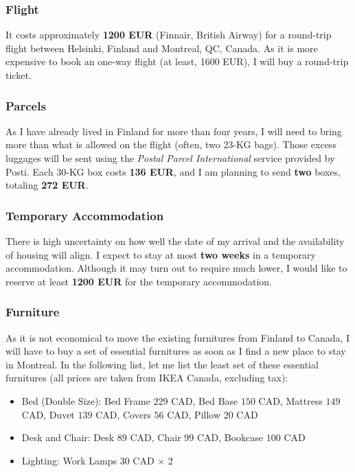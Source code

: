 \documentclass[11pt, oneside]{essay}
\begin{document}
\subsubsection{Flight}

It costs approximately \textbf{1200 EUR} (Finnair, British
Airway) for a round-trip flight between Helsinki, Finland
and Montreal, QC, Canada. As it is more expensive to book an
one-way flight (at least, 1600 EUR), I will buy a round-trip
ticket. 

\subsubsection{Parcels}

As I have already lived in Finland for more than four years,
I will need to bring more than what is allowed on the flight
(often, two 23-KG bags). Those excess luggages will be sent
using the \textit{Postal Parcel International} service
provided by Posti. Each 30-KG box costs \textbf{136 EUR},
and I am planning to send \textbf{two} boxes, totaling
\textbf{272 EUR}.

\subsubsection{Temporary Accommodation}

There is high uncertainty on how well the date of my arrival and
the availability of housing will align. I expect to stay at most
\textbf{two weeks} in a temporary accommodation. Although it may
turn out to require much lower, I would like to reserve at least
\textbf{1200 EUR} for the temporary accommodation.

\subsubsection{Furniture}

As it is not economical to move the existing furnitures from
Finland to Canada, I will have to buy a set of essential
furnitures as soon as I find a new place to stay in Montreal. In
the following list, let me list the least set of these essential
furnitures (all prices are taken from IKEA Canada, excluding
        tax):
\begin{itemize}
\item Bed (Double Size): Bed Frame $229$ CAD, Bed Base $150$ CAD,
    Mattress $149$ CAD, Duvet $139$ CAD, Covers $56$ CAD, Pillow
                         $20$ CAD
\item Desk and Chair: Desk $89$ CAD, Chair $99$ CAD, Bookcase
                         $100$ CAD
\item Lighting: Work Lamps $30$ CAD $\times$ 2
\end{itemize}
\end{document}
